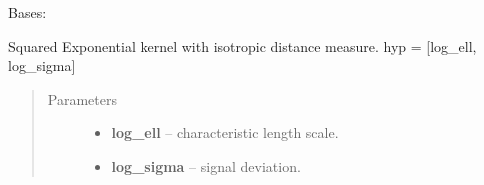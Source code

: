\documentclass[letterpaper,10pt,english]{sphinxmanual}
\begin{document}
\begin{fulllineitems}
\label{pyGPs.Core:pyGPs.Core.cov.RBF}
Bases: 

Squared Exponential kernel with isotropic distance measure. hyp = {[}log\_ell, log\_sigma{]}
\begin{quote}\begin{description}
\item[{Parameters}] \leavevmode\begin{itemize}
\item {} 
\textbf{log\_ell} -- characteristic length scale.

\item {} 
\textbf{log\_sigma} -- signal deviation.

\end{itemize}

\end{description}\end{quote}

\begin{fulllineitems}
\label{pyGPs.Core:pyGPs.Core.cov.RBF.getCovMatrix}
\end{fulllineitems}


\begin{fulllineitems}
\label{pyGPs.Core:pyGPs.Core.cov.RBF.getDerMatrix}
\end{fulllineitems}


\end{fulllineitems}

\end{document}
